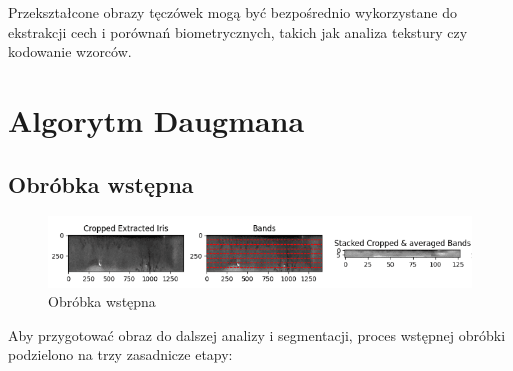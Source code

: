 \documentclass[a4paper]{article}
\begin{document}
Przekształcone obrazy tęczówek mogą być bezpośrednio wykorzystane do ekstrakcji cech i porównań biometrycznych, takich jak analiza tekstury czy kodowanie wzorców.

\clearpage

\section{Algorytm Daugmana}

\subsection*{Obróbka wstępna}

\begin{figure}[H]
    \centering
    \includegraphics[width=0.9\linewidth]{figures/obrobka wstepna.png}
    \caption{Obróbka wstępna}
\end{figure}

Aby przygotować obraz do dalszej analizy i segmentacji, proces wstępnej obróbki podzielono na trzy zasadnicze etapy:
\end{document}

